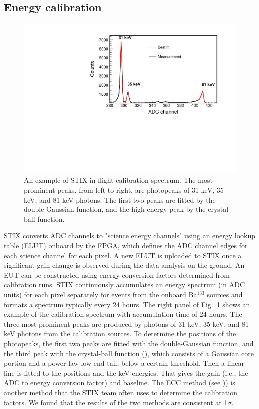 \documentclass[referee]{aa} %
\begin{document}
\subsection{Energy calibration}
\begin{figure}
 \centering
  \includegraphics[width=0.8\linewidth]{figures/cal-fit.pdf}
  \caption{An example of STIX in-flight calibration spectrum.
  The most prominent peaks, from left to right, are photopeaks of 31 keV, 35 keV, and 81 keV
  photons. The first two peaks are fitted by the double-Gaussian function, and the high energy peak by  
  the crystal-ball function. }
    \label{fig:cal-fit}
\end{figure}
STIX converts ADC channels to "science energy channels" using an energy lookup table (ELUT) 
onboard by the FPGA, which defines the ADC channel edges  for each science channel for each pixel. 
A new ELUT is uploaded to STIX once a significant gain change is observed during the data analysis on the ground.  An EUT can be constructed using energy conversion factors determined from calibration runs. 
STIX continuously accumulates an  energy spectrum (in ADC units) for each pixel separately for events from the onboard Ba$^{133}$ sources and formats a  spectrum typically every 24 hours. 
The right panel of Fig.~\ref{fig:cal-fit} shows an example of the calibration spectrum with accumulation time of 24 hours.  The three most prominent peaks are produced by photons of 31 keV, 35 keV, and 81 keV photons from the calibration sources. To determine the positions of the photopeaks, the first two peaks are fitted with the double-Gaussian function, and the third peak with the crystal-ball function (\cite{crsystallball}),
which consists of a Gaussian core portion 
and a power-law low-end tail, below a certain threshold.
Then a linear line is fitted to the positions and the keV energies.  That gives the gain (i.e., the ADC to energy conversion factor) and baseline.
The ECC method (see \cite{ecc,ecc2})) is another method that the STIX team often uses to determine the calibration factors.  We found that the results of the two methods are consistent at 1$\sigma$.
\end{document}
